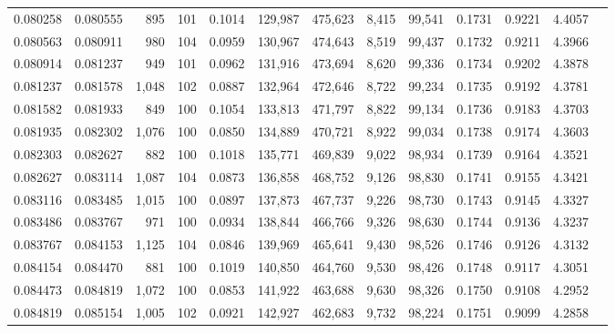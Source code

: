 \begin{tabular}{rrrrrrrrrrrrr}
0.080258 & 0.080555 &   895 & 101 &                                     0.1014 & 129,987 & 475,623 &   8,415 &  99,541 & 0.1731 & 0.9221 & 4.4057 \\
0.080563 & 0.080911 &   980 & 104 &                                     0.0959 & 130,967 & 474,643 &   8,519 &  99,437 & 0.1732 & 0.9211 & 4.3966 \\
0.080914 & 0.081237 &   949 & 101 &                                     0.0962 & 131,916 & 473,694 &   8,620 &  99,336 & 0.1734 & 0.9202 & 4.3878 \\
0.081237 & 0.081578 & 1,048 & 102 &                                     0.0887 & 132,964 & 472,646 &   8,722 &  99,234 & 0.1735 & 0.9192 & 4.3781 \\
0.081582 & 0.081933 &   849 & 100 &                                     0.1054 & 133,813 & 471,797 &   8,822 &  99,134 & 0.1736 & 0.9183 & 4.3703 \\
0.081935 & 0.082302 & 1,076 & 100 &                                     0.0850 & 134,889 & 470,721 &   8,922 &  99,034 & 0.1738 & 0.9174 & 4.3603 \\
0.082303 & 0.082627 &   882 & 100 &                                     0.1018 & 135,771 & 469,839 &   9,022 &  98,934 & 0.1739 & 0.9164 & 4.3521 \\
0.082627 & 0.083114 & 1,087 & 104 &                                     0.0873 & 136,858 & 468,752 &   9,126 &  98,830 & 0.1741 & 0.9155 & 4.3421 \\
0.083116 & 0.083485 & 1,015 & 100 &                                     0.0897 & 137,873 & 467,737 &   9,226 &  98,730 & 0.1743 & 0.9145 & 4.3327 \\
0.083486 & 0.083767 &   971 & 100 &                                     0.0934 & 138,844 & 466,766 &   9,326 &  98,630 & 0.1744 & 0.9136 & 4.3237 \\
0.083767 & 0.084153 & 1,125 & 104 &                                     0.0846 & 139,969 & 465,641 &   9,430 &  98,526 & 0.1746 & 0.9126 & 4.3132 \\
0.084154 & 0.084470 &   881 & 100 &                                     0.1019 & 140,850 & 464,760 &   9,530 &  98,426 & 0.1748 & 0.9117 & 4.3051 \\
0.084473 & 0.084819 & 1,072 & 100 &                                     0.0853 & 141,922 & 463,688 &   9,630 &  98,326 & 0.1750 & 0.9108 & 4.2952 \\
0.084819 & 0.085154 & 1,005 & 102 &                                     0.0921 & 142,927 & 462,683 &   9,732 &  98,224 & 0.1751 & 0.9099 & 4.2858 \\

\end{tabular}
